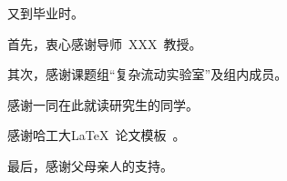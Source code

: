 \begin{acknowledgements}

又到毕业时。%

首先，衷心感谢导师~XXX~教授。%

其次，感谢课题组“复杂流动实验室”及组内成员。%

感谢一同在此就读研究生的同学。

感谢哈工大\LaTeX\ 论文模板\hithesis\ 。%

最后，感谢父母亲人的支持。%


\end{acknowledgements}
